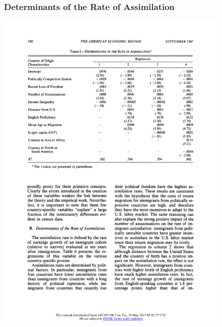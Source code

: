 \documentclass[10pt]{beamer}
\begin{document}
\begin{frame}[c]\frametitle{Determinants of the Rate of Assimilation}

\centerline{\includegraphics[width=0.85\textwidth]{DetReg2.pdf}}

\end{frame}
\end{document}
